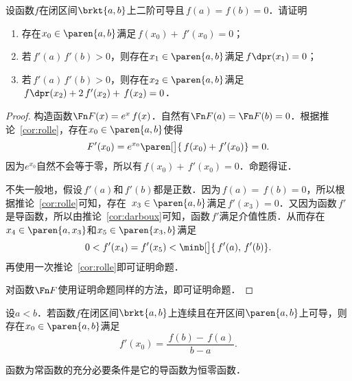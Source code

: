 \begin{example*}
  设函数\(f\)在闭区间\(\brkt{a,b}\)上二阶可导且\(\,f(a) = f(b) = 0\)．请证明
  \begin{enumerate}
    \renewcommand{\labelenumi}{\enumparen{\arabic{enumi}}}
  \item 存在\(x_0 \in \paren{a,b}\)满足\(\,f(x_0) + \,f'(x_0) = 0\)；
  \item 若\(\,f'(a)\,f'(b) > 0\)，则存在\(x_1 \in \paren{a,b}\)满足\(\,f\dpr(x_1) = 0\)；
  \item 若\(\,f'(a)\,f'(b) > 0\)，则存在\(x_2 \in \paren{a,b}\)满足\(\,f\dpr(x_2) + 2\,f'(x_2) + \,f(x_2) = 0\)．
  \end{enumerate}

  \begin{proof}
    构造函数\(\Fn F(x) = e^x\,f(x)\)．自然有\(\Fn F(a) = \Fn F(b) = 0\)．根据推论~\ref{cor:rolle}，存在\(x_0 \in \paren{a,b}\)使得
    \begin{equation*}
      F'(x_0) = e^{x_0}\paren[\big]{\,f(x_0) + f'(x_0)} = 0.
    \end{equation*}
    因为\(e^{x_0}\)自然不会等于零，所以有\(\,f(x_0) + \,f'(x_0) = 0\)．命题得证．

    不失一般地，假设\(\,f'(a)\)和\(\,f'(b)\)都是正数．因为\(\,f(a) = \,f(b) = 0 \)，所以根据推论~\ref{cor:rolle}可知，存在~\(x_3 \in \paren{a,b}\)满足\(\,f'(x_3) = 0\)．又因为函数\(\,f'\!\)是导函数，所以由推论~\ref{cor:darboux}可知，函数\(\,f'\!\)满足介值性质．从而存在\(x_4 \in \paren{a, x_3}\)和\(x_5 \in \paren{x_3, b}\)满足
    \begin{equation*}
      0 < f'(x_4) = f'(x_5) < \minb[\big]{\,f'(a), \,f'(b)}.
    \end{equation*}
    再使用一次推论~\ref{cor:rolle}即可证明命题．

    对函数\(\Fn F\)使用证明命题同样的方法，即可证明命题．
  \end{proof}
\end{example*}

\begin{theorem}[拉格朗日中值定理]
  \label{thm:lmvt}
  设\(a < b\)．若函数\(f\)在闭区间\(\brkt{a,b}\)上连续且在开区间\(\paren{a,b}\)上可导，则存在\(x_0 \in \paren{a,b}\)满足
  \begin{equation*}
    f'(x_0) = \frac{\,f(b) - \,f(a)}{b-a}.
  \end{equation*}
\end{theorem}

\begin{corollary}
  \label{cor:lmvtconst}
  函数为常函数的充分必要条件是它的导函数为恒零函数．
\end{corollary}

